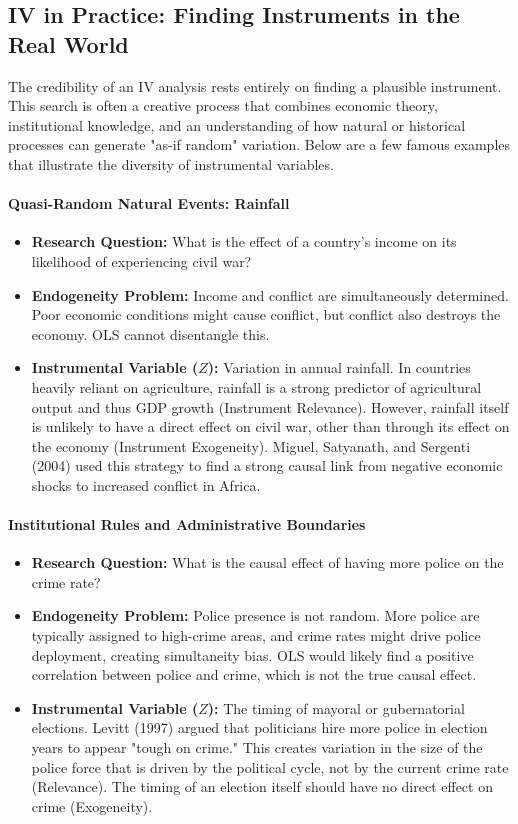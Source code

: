 \documentclass{article}
\begin{document}
\subsection{IV in Practice: Finding Instruments in the Real World}
\label{sub:iv_in_practice}

The credibility of an IV analysis rests entirely on finding a plausible instrument. This search is often a creative process that combines economic theory, institutional knowledge, and an understanding of how natural or historical processes can generate "as-if random" variation. Below are a few famous examples that illustrate the diversity of instrumental variables.

\paragraph{Quasi-Random Natural Events: Rainfall}
\begin{itemize}
    \item \textbf{Research Question:} What is the effect of a country's income on its likelihood of experiencing civil war?
    \item \textbf{Endogeneity Problem:} Income and conflict are simultaneously determined. Poor economic conditions might cause conflict, but conflict also destroys the economy. OLS cannot disentangle this.
    \item \textbf{Instrumental Variable ($Z$):} Variation in annual rainfall. In countries heavily reliant on agriculture, rainfall is a strong predictor of agricultural output and thus GDP growth (Instrument Relevance). However, rainfall itself is unlikely to have a direct effect on civil war, other than through its effect on the economy (Instrument Exogeneity). Miguel, Satyanath, and Sergenti (2004) used this strategy to find a strong causal link from negative economic shocks to increased conflict in Africa.
\end{itemize}

\paragraph{Institutional Rules and Administrative Boundaries}
\begin{itemize}
    \item \textbf{Research Question:} What is the causal effect of having more police on the crime rate?
    \item \textbf{Endogeneity Problem:} Police presence is not random. More police are typically assigned to high-crime areas, and crime rates might drive police deployment, creating simultaneity bias. OLS would likely find a positive correlation between police and crime, which is not the true causal effect.
    \item \textbf{Instrumental Variable ($Z$):} The timing of mayoral or gubernatorial elections. Levitt (1997) argued that politicians hire more police in election years to appear "tough on crime." This creates variation in the size of the police force that is driven by the political cycle, not by the current crime rate (Relevance). The timing of an election itself should have no direct effect on crime (Exogeneity).
\end{itemize}
\end{document}
